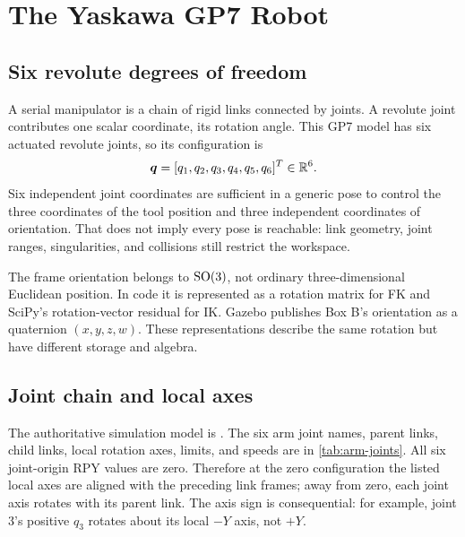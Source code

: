 \chapter{The Yaskawa GP7 Robot}
\label{ch:robot}

\section{Six revolute degrees of freedom}
A serial manipulator is a chain of rigid links connected by joints. A revolute
joint contributes one scalar coordinate, its rotation angle. This GP7 model
has six actuated revolute joints, so its configuration is
\begin{equation}
 \bm{q}=[q_1,q_2,q_3,q_4,q_5,q_6]^T\in\mathbb{R}^6.
\end{equation}
Six independent joint coordinates are sufficient in a generic pose to control
the three coordinates of the tool position and three independent coordinates
of orientation. That does not imply every pose is reachable: link geometry,
joint ranges, singularities, and collisions still restrict the workspace.

The frame orientation belongs to $\mathrm{SO}(3)$, not ordinary three-dimensional
Euclidean position. In code it is represented as a rotation matrix for FK and
SciPy's rotation-vector residual for IK. Gazebo publishes Box B's orientation
as a quaternion $(x,y,z,w)$. These representations describe the same rotation
but have different storage and algebra.

\section{Joint chain and local axes}
The authoritative simulation model is
. The six arm joint names, parent
links, child links, local rotation axes, limits, and speeds are in
\cref{tab:arm-joints}. All six joint-origin RPY values are zero. Therefore at
the zero configuration the listed local axes are aligned with the preceding
link frames; away from zero, each joint axis rotates with its parent link.
The axis sign is consequential: for example, joint 3's positive $q_3$ rotates
about its local $-Y$ axis, not $+Y$.

